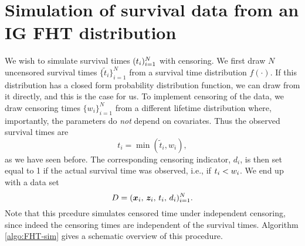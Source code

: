 \section{Simulation of survival data from an IG FHT distribution}\label{sec:simulate-IG-data}
We wish to simulate survival times $(t_{i})_{i=1}^N$ with censoring.
We first draw $N$ uncensored survival times $\{\tilde{t}_i\}_{i=1}^N$ from a survival time distribution $f(\cdot)$.
If this distribution has a closed form probability distribution function, we can draw from it directly, and this is the case for us.
To implement censoring of the data, we draw censoring times $\{w_i\}_{i=1}^N$ from a different lifetime distribution where, importantly, the parameters do \textit{not} depend on covariates.
Thus the observed survival times are
\begin{equation*}
    t_i=\min(\tilde{t}_i,w_i),
\end{equation*}
as we have seen before.
The corresponding censoring indicator, $d_i$, is then set equal to 1 if the actual survival time was observed, i.e., if $t_{i}<w_i$.
We end up with a data set
\begin{equation*}
    D=(\bm{x}_i,\,\bm{z}_i,\,t_i,\,d_i)_{i=1}^N.
\end{equation*}
Note that this prcedure simulates censored time under independent censoring, since indeed the censoring times are independent of the survival times.
Algorithm \ref{algo:FHT-sim} gives a schematic overview of this procedure.

